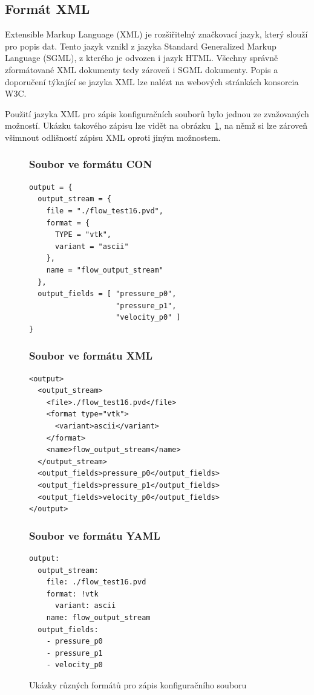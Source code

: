 \documentclass[FM,bw,DP]{tulthesis}
\begin{document}
\subsection{Formát XML}

Extensible Markup Language (XML) je rozšiřitelný značkovací jazyk, který slouží pro popis dat. Tento jazyk vznikl z jazyka Standard Generalized Markup Language (SGML), z kterého je odvozen i jazyk HTML. Všechny správně zformátované XML dokumenty tedy zároveň i SGML dokumenty. Popis a doporučení týkající se jazyka XML lze nalézt na webových stránkách konsorcia W3C.

Použití jazyka XML pro zápis konfiguračních souborů bylo jednou ze zvažovaných možností. Ukázku takového zápisu lze vidět na obrázku~\ref{img:conf_files}, na němž si lze zároveň všimnout odlišností zápisu XML oproti jiným možnostem.  

\begin{figure}[H]
\singlespacing
\subsubsection*{Soubor ve formátu CON}
\begin{lstlisting}
output = {
  output_stream = {
    file = "./flow_test16.pvd", 
    format = {
      TYPE = "vtk", 
      variant = "ascii"
    }, 
    name = "flow_output_stream"
  }, 
  output_fields = [ "pressure_p0",
                    "pressure_p1", 
                    "velocity_p0" ]
}
\end{lstlisting}

\subsubsection*{Soubor ve formátu XML}
\begin{lstlisting}
<output>
  <output_stream>
  	<file>./flow_test16.pvd</file>
  	<format type="vtk">
  	  <variant>ascii</variant>
  	</format>
  	<name>flow_output_stream</name>
  </output_stream>
  <output_fields>pressure_p0</output_fields>
  <output_fields>pressure_p1</output_fields>
  <output_fields>velocity_p0</output_fields>
</output>
\end{lstlisting}

\subsubsection*{Soubor ve formátu YAML}
\begin{lstlisting}
output:
  output_stream:
  	file: ./flow_test16.pvd
  	format: !vtk
  	  variant: ascii
  	name: flow_output_stream
  output_fields:
    - pressure_p0
    - pressure_p1
    - velocity_p0
\end{lstlisting}
\onehalfspacing
\caption{Ukázky různých formátů pro zápis konfiguračního souboru}
\label{img:conf_files}
\end{figure}
\end{document}
